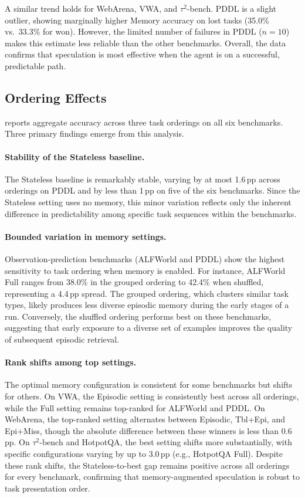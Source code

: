 \documentclass{article}
\begin{document}
A similar trend holds for WebArena, VWA, and $\tau^{2}$-bench. PDDL is a slight outlier, showing marginally higher Memory accuracy on lost tasks (35.0\% vs.\ 33.3\% for won). However, the limited number of failures in PDDL ($n=10$) makes this estimate less reliable than the other benchmarks. Overall, the data confirms that speculation is most effective when the agent is on a successful, predictable path.

\subsection{Ordering Effects}
\label{app:ordering}



 reports aggregate accuracy across three task orderings on all six benchmarks. Three primary findings emerge from this analysis.

\paragraph{Stability of the Stateless baseline.}
The Stateless baseline is remarkably stable, varying by at most 1.6\,pp across orderings on PDDL and by less than 1\,pp on five of the six benchmarks. Since the Stateless setting uses no memory, this minor variation reflects only the inherent difference in predictability among specific task sequences within the benchmarks.

\paragraph{Bounded variation in memory settings.}
Observation-prediction benchmarks (ALFWorld and PDDL) show the highest sensitivity to task ordering when memory is enabled. For instance, ALFWorld Full ranges from 38.0\% in the grouped ordering to 42.4\% when shuffled, representing a 4.4\,pp spread. The grouped ordering, which clusters similar task types, likely produces less diverse episodic memory during the early stages of a run. Conversely, the shuffled ordering performs best on these benchmarks, suggesting that early exposure to a diverse set of examples improves the quality of subsequent episodic retrieval.

\paragraph{Rank shifts among top settings.}
The optimal memory configuration is consistent for some benchmarks but shifts for others. On VWA, the Episodic setting is consistently best across all orderings, while the Full setting remains top-ranked for ALFWorld and PDDL. On WebArena, the top-ranked setting alternates between Episodic, Tbl+Epi, and Epi+Miss, though the absolute difference between these winners is less than 0.6\,pp. On $\tau^{2}$-bench and HotpotQA, the best setting shifts more substantially, with specific configurations varying by up to 3.0\,pp (e.g., HotpotQA Full). Despite these rank shifts, the Stateless-to-best gap remains positive across all orderings for every benchmark, confirming that memory-augmented speculation is robust to task presentation order.
\end{document}

